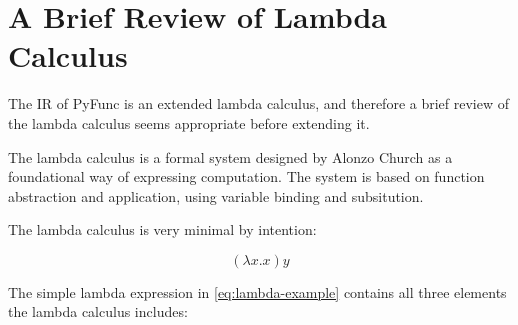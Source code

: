\documentclass{l4proj}
\begin{document}







\section{A Brief Review of Lambda Calculus} \label{sec:lambda-review}

The IR of PyFunc is an extended lambda calculus, and therefore a brief review of the lambda calculus seems appropriate before extending it.

The lambda calculus is a formal system designed by Alonzo Church as a foundational way of expressing computation.
The system is based on function abstraction and application, using variable binding and subsitution.

The lambda calculus is very minimal by intention:

\begin{equation} \label{eq:lambda-example}
    (\lambda x . x) y
\end{equation}

The simple lambda expression in \ref{eq:lambda-example} contains all three elements the lambda calculus includes:

\begin{table}[!h]
\end{table}
\end{document}
